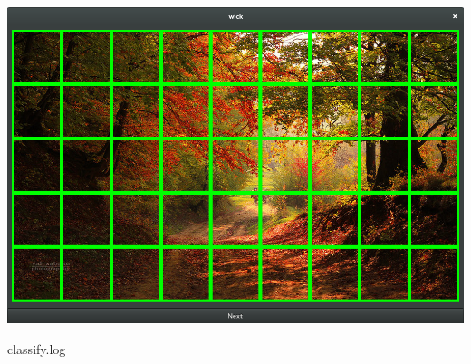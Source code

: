 \documentclass{article}
\begin{document}
\begin{center}
    \includegraphics[width=\textwidth]{wick-class-07}
\end{center}

\newpage

                {classify.log} 
\end{document}
